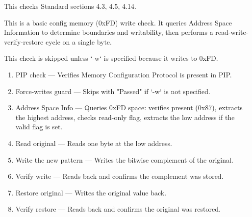 This checks Standard sections 4.3, 4.5, 4.14.

This is a basic config memory (0xFD) write check.  It queries Address Space Information to
determine boundaries and writability, then performs a read-write-verify-restore
cycle on a single byte.

This check is skipped unless `-w` is specified because it writes to 0xFD.

\begin{enumerate}

\item PIP check — Verifies Memory Configuration Protocol is present in PIP.

\item Force-writes guard — Skips with "Passed" if `-w` is not specified.

\item Address Space Info — Queries 0xFD space: verifies present (0x87),
   extracts the highest address, checks read-only flag, extracts the low address
   if the valid flag is set.

\item Read original — Reads one byte at the low address.

\item Write the new pattern — Writes the bitwise complement of the original.

\item Verify write — Reads back and confirms the complement was stored.

\item Restore original — Writes the original value back.

\item Verify restore — Reads back and confirms the original was restored.

\end{enumerate}

  
